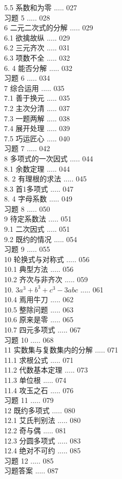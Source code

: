 \documentclass[10pt]{article}
\begin{document}
5.5 系数和为零 ..... 027\\
习题 5 ..... 028\\
6 二元二次式的分解 ..... 029\\
6.1 欲擒故纵 ..... 029\\
6.2 三元齐次 ..... 031\\
6.3 项数不全 ..... 032\\
6. 4 能否分解 ..... 032\\
习题 6 ..... 034\\
7 综合运用 ..... 035\\
7.1 善于换元 ..... 035\\
7.2 主次分清 ..... 037\\
7.3 一题两解 ..... 038\\
7.4 展开处理 ..... 039\\
7.5 巧运匠心 ..... 040\\
习题 7 ..... 042\\
8 多项式的一次因式 ..... 044\\
8.1 余数定理 ..... 044\\
8. 2 有理根的求法 ..... 045\\
8.3 首1多项式 ..... 047\\
8. 4 字母系数 ..... 049\\
习题 8 ..... 050\\
9 待定系数法 ..... 051\\
9.1 二次因式 ..... 051\\
9.2 既约的情况 ..... 054\\
习题 9 ..... 055\\
10 轮换式与对称式 ..... 056\\
10.1 典型方法 ..... 056\\
10.2 齐次与非齐次 ..... 059\\
10. $3 a^{3}+b^{3}+c^{3}-3 a b c$ ..... 061\\
10.4 焉用牛刀 ..... 062\\
10.5 整除问题 ..... 063\\
10.6 原来是零 ..... 065\\
10.7 四元多项式 ..... 067\\
习题 10 ..... 068\\
11 实数集与复数集内的分解 ..... 071\\
11.1 求根公式 ..... 071\\
11.2 代数基本定理 ..... 073\\
11.3 单位根 ..... 074\\
11.4 攻玉之石 ..... 076\\
习题 11 ..... 079\\
12 既约多项式 ..... 080\\
12.1 艾氏判别法 ..... 080\\
12.2 奇与偶 ..... 081\\
12.3 分圆多项式 ..... 083\\
12.4 绝对不可约 ..... 085\\
习题 12 ..... 085\\
习题答案 ..... 087
\end{document}

